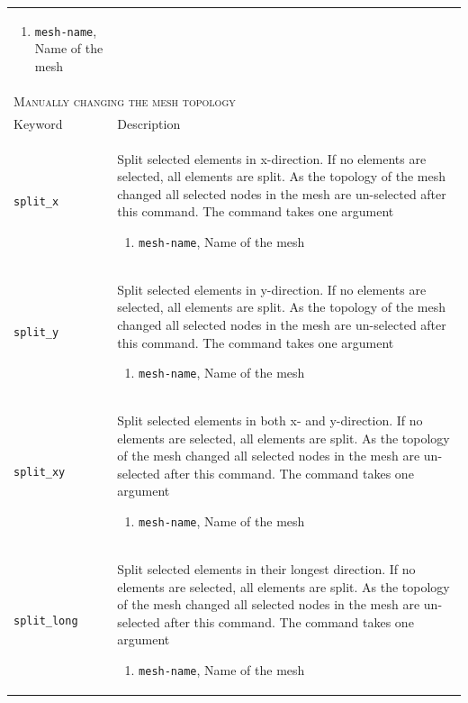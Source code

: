 \documentclass[noshowpacs,preprintnumbers,amsmath,amssymb, letter]{revtex4}
\begin{document}
\begin{longtable}{p{}p{}}
\begin{enumerate}
\item \texttt{mesh-name}, Name of the mesh
\end{enumerate}\\
\multicolumn{2}{l}{\textsc{Manually changing the mesh topology}} \\*
\hline
Keyword & Description \\
\texttt{split\_x}	& Split selected elements in x-direction. If no elements are selected, all elements are split. As the topology of the mesh changed all selected nodes in the mesh are un-selected after this command. The command takes one argument 
\begin{enumerate}
\item \texttt{mesh-name}, Name of the mesh
\end{enumerate}\\
\texttt{split\_y}	& Split selected elements in y-direction. If no elements are selected, all elements are split. As the topology of the mesh changed all selected nodes in the mesh are un-selected after this command. The command takes one argument 
\begin{enumerate}
\item \texttt{mesh-name}, Name of the mesh
\end{enumerate}\\
\texttt{split\_xy}	& Split selected elements in both x- and y-direction. If no elements are selected, all elements are split. As the topology of the mesh changed all selected nodes in the mesh are un-selected after this command. The command takes one argument 
\begin{enumerate}
\item \texttt{mesh-name}, Name of the mesh
\end{enumerate}\\
\texttt{split\_long}	& Split selected elements in their longest direction. If no elements are selected, all elements are split. As the topology of the mesh changed all selected nodes in the mesh are un-selected after this command. The command takes one argument 
\begin{enumerate}
\item \texttt{mesh-name}, Name of the mesh
\end{enumerate}\\

\end{longtable}
\end{document}
